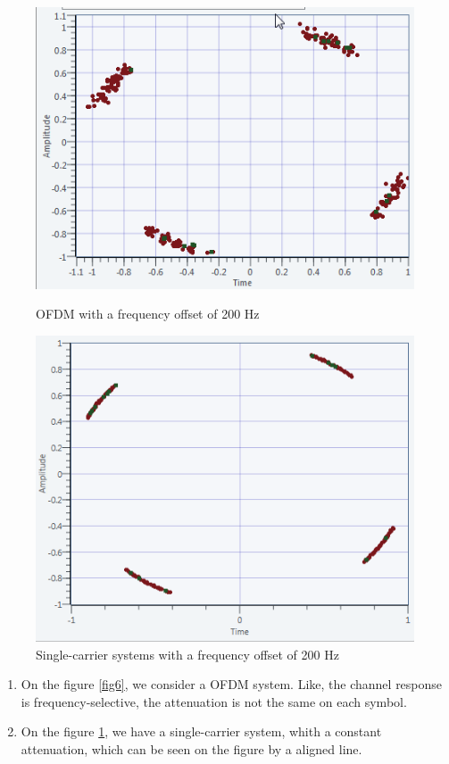 \documentclass[frenchb, oneside, headings=normal]{scrartcl}
\begin{document}
\begin{figure}[!ht]
    \begin{minipage}[b]{0.48\linewidth}
        \centering \includegraphics[scale=0.58]{img/multicarrier_200hz.png}
     \caption{OFDM with a frequency offset of 200 Hz}
     \label{fig6}
    \end{minipage}\hfill
    \begin{minipage}[b]{0.48\linewidth}
         \centering \includegraphics[scale=0.5]{img/SingleCarrier_Offset_200}
 \caption{Single-carrier systems with a frequency offset of 200 Hz}\label{fig7}
    \end{minipage}
\end{figure}

\begin{enumerate}

\item On the figure \ref{fig6}, we consider a OFDM system. Like, the channel response is frequency-selective, the attenuation is not the same on each symbol.

\item  On the figure \ref{fig7}, we have a single-carrier system, whith a constant attenuation, which can be seen on the figure by a aligned line.
\end{enumerate}
\end{document}

